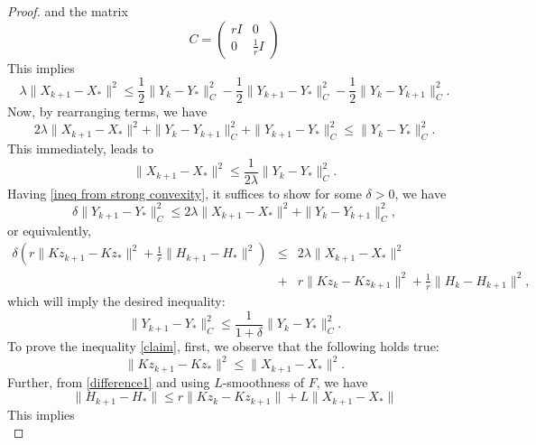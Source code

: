 \begin{proof}
and the matrix 
\begin{equation}
    C = \begin{pmatrix}
r I & 0 \\
0 &  \frac{1}{r} I
\end{pmatrix}
\end{equation}
This implies
\begin{equation}
    \lambda  \| X_{k+1} - X_* \|^2 \leq  \frac{1}{2} \|Y_k -Y_* \|^2_C - \frac{1}{2}  \|Y_{k+1} - Y_* \|^2_C -  \frac{1}{2}  \| Y_k - Y_{k+1}\|^2_C. 
\end{equation}
Now, by rearranging terms, we have 
\begin{equation}\label{ineq from strong convexity}
2\lambda \| X_{k+1} - X_* \|^2 + \| Y_k - Y_{k+1}\|^2_C + \|Y_{k+1} - Y_* \|^2_C \leq  \|Y_k -Y_* \|^2_C.
\end{equation}
This immediately, leads to 
\begin{equation}
\|X_{k+1} - X_* \|^2 \leq \frac{1}{2 \lambda} \|Y_{k} - Y_* \|^2_C.
\end{equation}
Having \eqref{ineq from strong convexity}, it suffices to show for some $\delta > 0$, we have 
\begin{equation}\label{claim}
\delta \|Y_{k+1} - Y_* \|^2_C \leq 2 \lambda \|X_{k+1} - X_* \|^2 + \| Y_k - Y_{k+1}\|^2_C,
\end{equation}
or equivalently,
\begin{eqnarray*}\label{claimequivalence}
\delta \left( r  \|Kz_{k+1}- Kz_{*} \|^2 + \frac{1}{r} \|H_{k+1} - H_{*} \|^2 \right) &\leq&  2 \lambda \|X_{k+1} - X_* \|^2 \\
&+& r \|Kz_{k}- Kz_{k+1} \|^2 + \frac{1}{r} \|H_k - H_{k+1} \|^2, 
\end{eqnarray*}
which will imply the desired inequality: 
\begin{equation}
\|Y_{k+1} - Y_* \|^2_C \leq \frac{1}{1 +\delta} \|Y_{k} - Y_* \|^2_C.
\end{equation}
To prove the inequality \eqref{claim}, first, we observe that the following holds true:   
\begin{equation}\label{bound on z-z*}
\|Kz_{k+1} - Kz_* \|^2 \leq \|X_{k+1} -X_* \|^2.  
\end{equation}
Further, from \eqref{difference1} and using $L$-smoothness of $F$, we have  
\begin{equation}
\|H_{k+1} - H_* \| \leq r \|K z_k - K z_{k+1} \| + L \| X_{k+1} -  X_*\|
\end{equation}
This implies 
\begin{equation}\label{bound on H-H*}

\end{equation}
\end{proof}
